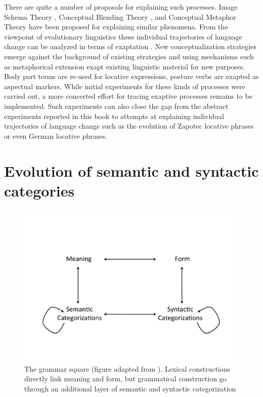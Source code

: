 There are quite a number of proposals for explaining such processes. 
Image Schema Theory \citep{johnson1987body}, 
Conceptual Blending Theory \citep{fauconnier1994mental}, and
Conceptual Metaphor Theory \citep{lakoff1980metaphors}
have been proposed for explaining similar phenomena.
From the viewpoint of evolutionary linguistics these individual 
trajectories of language change can be analyzed in terms of exaptation 
\citep{lass1990things,lass1997historical}. New conceptualization strategies emerge 
against the background of existing
strategies and using mechanisms such as metaphorical extension exapt
existing linguistic material for new purposes. Body part terms are re-used
for locative expressions, posture verbs are exapted as aspectual markers.
While initial experiments for these kinds of processes were carried out, a 
more concerted effort for tracing exaptive processes remains to be implemented.
Such experiments can also close the gap from the abstract experiments reported
in this book to attempts at explaining individual trajectories of language change
such as the evolution of Zapotec locative phrases or even German locative phrases.

\section{Evolution of semantic and syntactic categories}
\begin{figure}
\begin{center}
\includegraphics[width=0.7\columnwidth]{figs/grammar-square}
\end{center}
\caption[Grammar square]{The grammar square (figure 
adapted from \citealp{steels2011design}). Lexical constructions directly link meaning
and form, but grammatical construction go through an additional layer of
semantic and syntactic categorization}
\label{f:grammar-square}
\end{figure}

